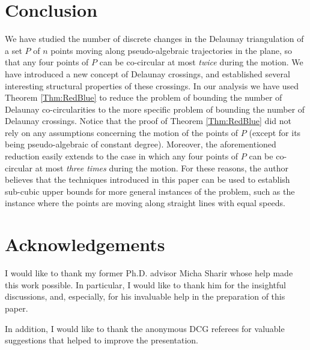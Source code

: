 \documentclass[letter,11pt]{article}
\begin{document}
\section{Conclusion} We have studied the number of discrete changes in the Delaunay triangulation of a set $P$ of $n$ points moving along pseudo-algebraic trajectories in the plane, so that any four points of $P$ can be co-circular at most {\it twice} during the motion. 
We have introduced a new concept of Delaunay crossings, and established several interesting structural properties of these crossings.
In our analysis we have used Theorem \ref{Thm:RedBlue} to reduce the problem of bounding the number of Delaunay co-circularities to the more specific problem of bounding the number of Delaunay crossings. Notice that the proof of Theorem \ref{Thm:RedBlue} did not rely on any assumptions concerning the motion of the points of $P$ (except for its being pseudo-algebraic of constant degree). Moreover, the aforementioned reduction easily extends to 
the case in which any four points of $P$ can be co-circular at most {\it three times} during the motion.
For these reasons, the author believes that the techniques introduced in this paper can be used to establish sub-cubic upper bounds for more general instances of the problem, such as the instance where the points are moving along straight lines with equal speeds.

\section{Acknowledgements} I would like to thank my former Ph.D. advisor Micha Sharir 
whose help made this work possible.
In particular, I would like to thank him for the insightful discussions, and, especially, for his invaluable help in the preparation of this paper. 

In addition, I would like to thank the anonymous
DCG referees for valuable suggestions that helped to improve the
presentation.
\end{document}
